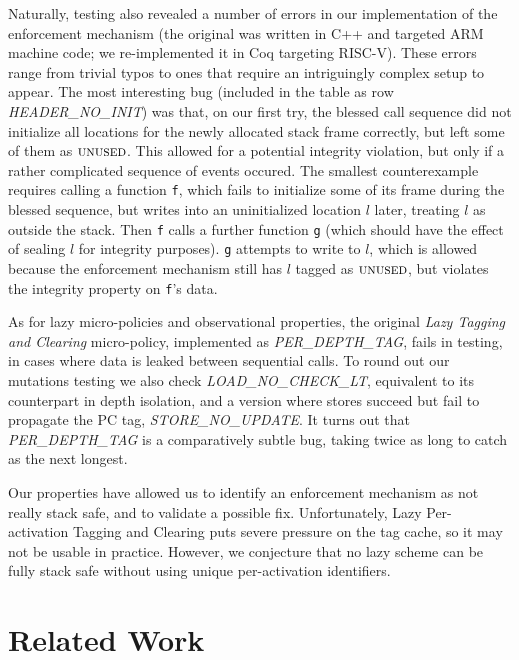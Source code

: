 \documentclass[10pt,conference]{ieeetran}%
\theoremstyle{definition}
\begin{document}
{Naturally, testing also revealed a number of errors in our
implementation of the enforcement mechanism (the original was written in C++
and targeted ARM machine code;
we re-implemented it in Coq targeting RISC-V).  These errors range
from trivial typos to ones that require an intriguingly complex setup
to appear.  The most interesting bug (included in the table as row
{\em HEADER\_NO\_INIT}) was that, on our first try, the blessed call
sequence %
did not initialize all locations for the
newly allocated stack frame correctly, but left some of them as
$\textsc{unused}$. This allowed for a potential integrity violation, but
only if a rather complicated sequence of events occured.
The smallest counterexample requires calling a function {\tt f},
which fails to initialize some of its frame during the blessed sequence,
but writes into an uninitialized location $l$ later, treating \(l\) as outside
the stack. Then {\tt f} calls a further function {\tt g} (which should have
the effect of sealing $l$ for integrity purposes). {\tt g} attempts to write to $l$,
which is allowed because the enforcement mechanism still has
$l$ tagged as $\textsc{unused}$, but violates the integrity property on {\tt f}'s data.

As for lazy micro-policies and observational properties,
the original {\em Lazy Tagging and Clearing} micro-policy, implemented as {\em PER\_DEPTH\_TAG},
fails in testing, in cases where data is leaked between sequential calls.
To round out our mutations testing we also check {\em LOAD\_NO\_CHECK\_LT},
equivalent to its counterpart in depth isolation,
and a version where stores succeed but fail to propagate the PC tag, {\em STORE\_NO\_UPDATE}.
It turns out that {\em PER\_DEPTH\_TAG} is a comparatively subtle bug,
taking twice as long to catch as the next longest.

Our properties have allowed us to identify an enforcement mechanism as
not really stack safe, and to validate a possible fix.
Unfortunately, Lazy Per-activation Tagging and Clearing
puts severe pressure on the tag cache, so it may not be usable in practice.
However, we conjecture that no lazy scheme can be fully stack safe
without using unique per-activation identifiers.

\section{Related Work}
\label{sec:relwork}

}
\end{document}
